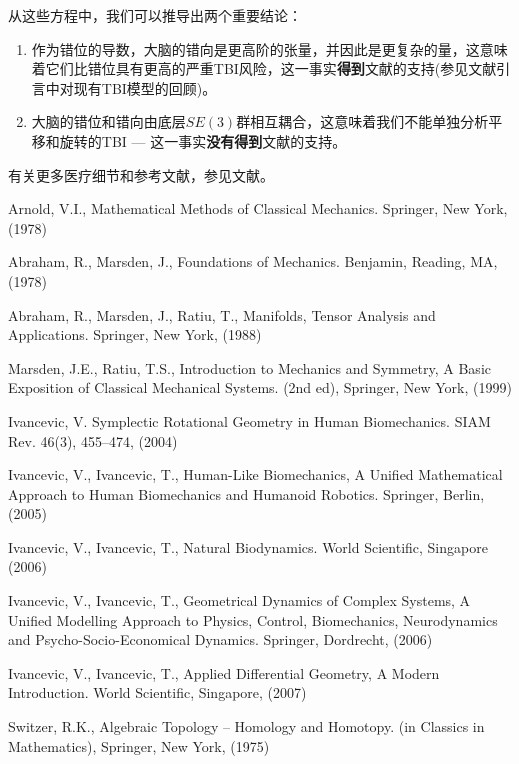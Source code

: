 \documentclass[11pt,fontset=founder]{ctexart}
\begin{document}
从这些方程中，我们可以推导出两个重要结论：

\begin{enumerate}
\item  作为错位的导数，大脑的错向是更高阶的张量，并因此是更复杂的量，这意味着它们比错位具有更高的严重TBI风险，这一事实\textbf{得到}文献的支持(参见文献\cite{ivbrain}引言中对现有TBI模型的回顾)。

\item  大脑的错位和错向由底层$SE(3)$群相互耦合，这意味着我们不能单独分析平移和旋转的TBI — 这一事实\textbf{没有得到}文献的支持。
\end{enumerate}

有关更多医疗细节和参考文献，参见文献\cite{ivbrain}。


\begin{thebibliography}{99}
 Arnold, V.I., Mathematical Methods of Classical Mechanics.
Springer, New York, (1978)

 Abraham, R., Marsden, J., Foundations of Mechanics.
Benjamin, Reading, MA, (1978)

 Abraham, R., Marsden, J., Ratiu, T., Manifolds, Tensor
Analysis and Applications. Springer, New York, (1988)

 Marsden, J.E., Ratiu, T.S., Introduction to Mechanics and
Symmetry, A Basic Exposition of Classical Mechanical Systems. (2nd ed),
Springer, New York, (1999)

 Ivancevic, V. Symplectic Rotational Geometry in Human
Biomechanics. SIAM Rev. 46(3), 455--474, (2004)

 Ivancevic, V., Ivancevic, T., Human-Like
Biomechanics, A Unified Mathematical Approach to Human Biomechanics and
Humanoid Robotics. Springer, Berlin, (2005)

 Ivancevic, V., Ivancevic, T., Natural Biodynamics. World
Scientific, Singapore (2006)

 Ivancevic, V., Ivancevic, T., Geometrical Dynamics of
Complex Systems, A Unified Modelling Approach to Physics, Control,
Biomechanics, Neurodynamics and Psycho-Socio-Economical Dynamics. Springer,
Dordrecht, (2006)

 Ivancevic, V., Ivancevic, T., Applied Differential
Geometry, A Modern Introduction. World Scientific, Singapore, (2007)

 Switzer, R.K., Algebraic Topology -- Homology and
Homotopy. (in Classics in Mathematics), Springer, New York, (1975)


\end{thebibliography}
\end{document}
